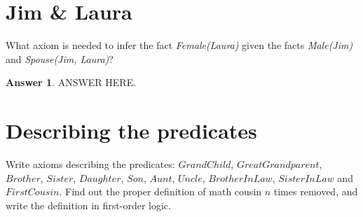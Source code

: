 \documentclass[a4paper]{article}
\renewcommand{\(}{\left(}
\renewcommand{\)}{\right)}
\theoremstyle{plain}
\theoremstyle{plain}
\theoremstyle{definition}
\newtheorem*{answer}{Answer}
\begin{document}
\section{Jim \& Laura}
What axiom is needed to infer the fact \textit{Female(Laura)} given the facts \textit{Male(Jim)} and \textit{Spouse(Jim, Laura)}?

\begin{shaded}
\begin{answer}
ANSWER HERE.
\end{answer}
\end{shaded}

\section{Describing the predicates}
Write axioms describing the predicates: $GrandChild$, $GreatGrandparent$, $Brother$, $Sister$, $Daughter$, $Son$, $Aunt$, $Uncle$, $BrotherInLaw$, $SisterInLaw$ and $FirstCousin$. Find out the proper definition of math cousin $n$ times removed, and write the definition in first-order logic.
\end{document}
